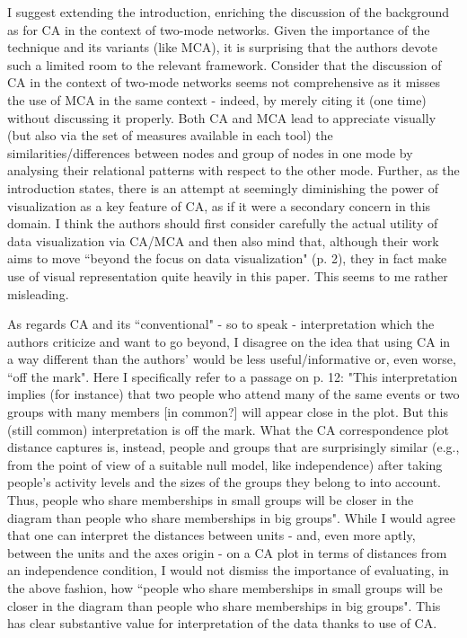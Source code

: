 \documentclass[]{letter}
\begin{document}
I suggest extending the introduction, enriching the discussion of the background as for CA in the context of two-mode networks. Given the importance of the technique and its variants (like MCA), it is surprising that the authors devote such a limited room to the relevant framework. Consider that the discussion of CA in the context of two-mode networks seems not comprehensive as it misses the use of MCA in the same context - indeed, by merely citing it (one time) without discussing it properly. Both CA and MCA lead to appreciate visually (but also via the set of measures available in each tool) the similarities/differences between nodes and group of nodes in one mode by analysing their relational patterns with respect to the other mode.
Further, as the introduction states, there is an attempt at seemingly diminishing the power of visualization as a key feature of CA, as if it were a secondary concern in this domain. I think the authors should first consider carefully the actual utility of data visualization via CA/MCA and then also mind that, although their work aims to move ``beyond the focus on data visualization" (p. 2), they in fact make use of visual representation quite heavily in this paper. This seems to me rather misleading.

As regards CA and its ``conventional" - so to speak - interpretation which the authors criticize and want to go beyond, I disagree on the idea that using CA in a way different than the authors' would be less useful/informative or, even worse, ``off the mark". Here I specifically refer to a passage on p. 12:
"This interpretation implies (for instance) that two people who attend many of the same events or two groups with many members [in common?] will appear close in the plot. But this (still common) interpretation is off the mark. What the CA correspondence plot distance captures is, instead, people and groups that are surprisingly similar (e.g., from the point of view of a suitable null model, like independence) after taking people's activity levels and the sizes of the groups they belong to into account. Thus, people who share memberships in small groups will be closer in the diagram than people who share memberships in big groups".
While I would agree that one can interpret the distances between units - and, even more aptly, between the units and the axes origin - on a CA plot in terms of distances from an independence condition, I would not dismiss the importance of evaluating, in the above fashion, how ``people who share memberships in small groups will be closer in the diagram than people who share memberships in big groups". This has clear substantive value for interpretation of the data thanks to use of CA.
\end{document}
